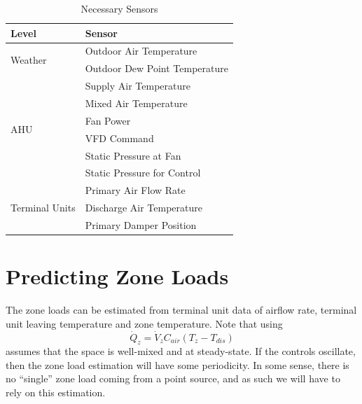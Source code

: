 \begin{table}
\centering
\begin{tabular}{l l}
\toprule

Level & Sensor \\
\midrule\midrule
\multirow{2}{*}{Weather} & Outdoor Air Temperature \\
 & Outdoor Dew Point Temperature \\

 \midrule

\multirow{6}{*}{AHU}              & Supply Air Temperature      \\
                                  & Mixed Air Temperature       \\
                                  & Fan Power                   \\
                                  & VFD Command                 \\
                                  & Static Pressure at Fan      \\
                                  & Static Pressure for Control \\
\midrule
\multirow{4}{*}{Terminal Units}   & Primary Air Flow Rate       \\
                                  & Discharge Air Temperature   \\
                                  & Primary Damper Position     \\

\bottomrule

\end{tabular}
\caption{Necessary Sensors}
\label{tab:NecessarySensors}
\end{table}

\section{Predicting Zone Loads}

The zone loads can be estimated from terminal unit data of airflow rate,
terminal unit leaving temperature and zone temperature. Note that using
%
\begin{equation} \dot Q_{z} = \dot V_{z} C_{air} \left(T_{z}-T_{dis} \right) \end{equation}
%
assumes that the space is well-mixed and at steady-state. If the
controls oscillate, then the zone load estimation will have some
periodicity. In some sense, there is no ``single'' zone load coming from
a point source, and as such we will have to rely on this estimation.

